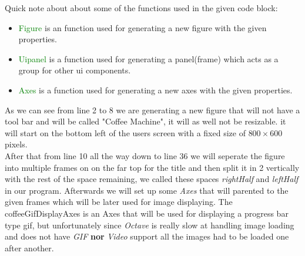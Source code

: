 \documentclass[a4paper, 10pt]{article}
\begin{document}
			\noindent Quick note about about some of the functions used in the given code block:
			\begin{itemize}
				\item \textcolor{green}{Figure} is an function used for generating a new figure with the given properties.
				\item \textcolor{green}{Uipanel} is a function used for generating a panel(frame) which acts as a group for other ui components.
				\item \textcolor{green}{Axes} is a function used for generating a new axes with the given properties.
			\end{itemize}
			\noindent As we can see from line 2 to 8 we are generating a new figure that will not have a tool bar and will be called "Coffee Machine", it will as well not be resizable. it will start on the bottom left of the users screen with a fixed size of
			$800 \times 600$ pixels. \\

			\noindent After that from line 10 all the way down to line 36 we will seperate the figure into multiple frames on on the far top for the title and then split it in 2 vertically with the rest of the space remaining, we called these spaces
			\emph{rightHalf} and \emph{leftHalf} in our program. Afterwards we will set up some \emph{Axes} that will parented to the given frames which will be later used for image displaying. The coffeeGifDisplayAxes is an Axes that will be used for displaying a
			progress bar type gif, but unfortunately since \emph{Octave} is really slow at handling image loading and does not have \emph{GIF} \textbf{nor} \emph{Video} support all the images had to be loaded one after another.\\

		\hline
\end{document}
